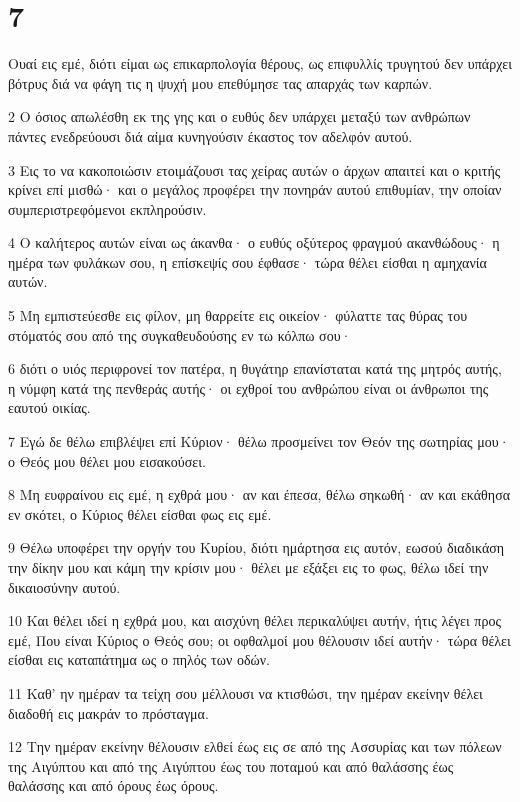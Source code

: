 \chapter{7}

\par Ουαί εις εμέ, διότι είμαι ως επικαρπολογία θέρους, ως επιφυλλίς τρυγητού δεν υπάρχει βότρυς διά να φάγη τις η ψυχή μου επεθύμησε τας απαρχάς των καρπών.
\par 2 Ο όσιος απωλέσθη εκ της γης και ο ευθύς δεν υπάρχει μεταξύ των ανθρώπων πάντες ενεδρεύουσι διά αίμα κυνηγούσιν έκαστος τον αδελφόν αυτού.
\par 3 Εις το να κακοποιώσιν ετοιμάζουσι τας χείρας αυτών ο άρχων απαιτεί και ο κριτής κρίνει επί μισθώ· και ο μεγάλος προφέρει την πονηράν αυτού επιθυμίαν, την οποίαν συμπεριστρεφόμενοι εκπληρούσιν.
\par 4 Ο καλήτερος αυτών είναι ως άκανθα· ο ευθύς οξύτερος φραγμού ακανθώδους· η ημέρα των φυλάκων σου, η επίσκεψίς σου έφθασε· τώρα θέλει είσθαι η αμηχανία αυτών.
\par 5 Μη εμπιστεύεσθε εις φίλον, μη θαρρείτε εις οικείον· φύλαττε τας θύρας του στόματός σου από της συγκαθευδούσης εν τω κόλπω σου·
\par 6 διότι ο υιός περιφρονεί τον πατέρα, η θυγάτηρ επανίσταται κατά της μητρός αυτής, η νύμφη κατά της πενθεράς αυτής· οι εχθροί του ανθρώπου είναι οι άνθρωποι της εαυτού οικίας.
\par 7 Εγώ δε θέλω επιβλέψει επί Κύριον· θέλω προσμείνει τον Θεόν της σωτηρίας μου· ο Θεός μου θέλει μου εισακούσει.
\par 8 Μη ευφραίνου εις εμέ, η εχθρά μου· αν και έπεσα, θέλω σηκωθή· αν και εκάθησα εν σκότει, ο Κύριος θέλει είσθαι φως εις εμέ.
\par 9 Θέλω υποφέρει την οργήν του Κυρίου, διότι ημάρτησα εις αυτόν, εωσού διαδικάση την δίκην μου και κάμη την κρίσιν μου· θέλει με εξάξει εις το φως, θέλω ιδεί την δικαιοσύνην αυτού.
\par 10 Και θέλει ιδεί η εχθρά μου, και αισχύνη θέλει περικαλύψει αυτήν, ήτις λέγει προς εμέ, Που είναι Κύριος ο Θεός σου; οι οφθαλμοί μου θέλουσιν ιδεί αυτήν· τώρα θέλει είσθαι εις καταπάτημα ως ο πηλός των οδών.
\par 11 Καθ' ην ημέραν τα τείχη σου μέλλουσι να κτισθώσι, την ημέραν εκείνην θέλει διαδοθή εις μακράν το πρόσταγμα.
\par 12 Την ημέραν εκείνην θέλουσιν ελθεί έως εις σε από της Ασσυρίας και των πόλεων της Αιγύπτου και από της Αιγύπτου έως του ποταμού και από θαλάσσης έως θαλάσσης και από όρους έως όρους.
